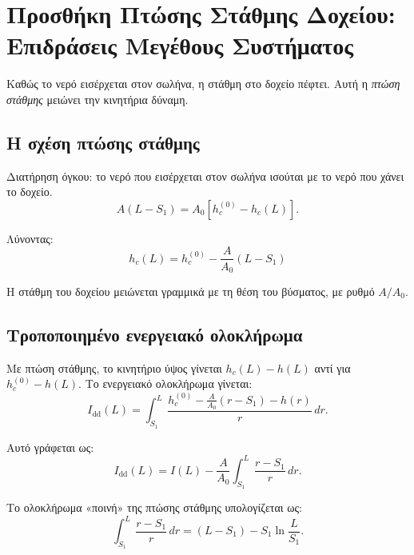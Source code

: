 \documentclass[11pt]{article}
\begin{document}
\section{Προσθήκη Πτώσης Στάθμης Δοχείου: Επιδράσεις Μεγέθους Συστήματος}
\label{sec:drawdown}

Καθώς το νερό εισέρχεται στον σωλήνα, η στάθμη στο δοχείο πέφτει. Αυτή η \emph{πτώση στάθμης} μειώνει την κινητήρια δύναμη.

\subsection{Η σχέση πτώσης στάθμης}

Διατήρηση όγκου: το νερό που εισέρχεται στον σωλήνα ισούται με το νερό που χάνει το δοχείο.
\[
  A(L - S_1) = A_0[h_c^{(0)} - h_c(L)].
\]

Λύνοντας:
\begin{equation}
  \boxed{h_c(L) = h_c^{(0)} - \frac{A}{A_0}(L - S_1)}
  \label{eq:drawdown}
\end{equation}

Η στάθμη του δοχείου μειώνεται γραμμικά με τη θέση του βύσματος, με ρυθμό $A/A_0$.

\subsection{Τροποποιημένο ενεργειακό ολοκλήρωμα}

Με πτώση στάθμης, το κινητήριο ύψος γίνεται $h_c(L) - h(L)$ αντί για $h_c^{(0)} - h(L)$. Το ενεργειακό ολοκλήρωμα γίνεται:
\begin{equation}
  I_{\text{dd}}(L) = \int_{S_1}^{L} \frac{h_c^{(0)} - \frac{A}{A_0}(r - S_1) - h(r)}{r} \, dr.
  \label{eq:I-dd-def}
\end{equation}

Αυτό γράφεται ως:
\begin{equation}
  I_{\text{dd}}(L) = I(L) - \frac{A}{A_0} \int_{S_1}^{L} \frac{r - S_1}{r} \, dr.
  \label{eq:I-dd-split}
\end{equation}

Το ολοκλήρωμα «ποινή» της πτώσης στάθμης υπολογίζεται ως:
\begin{equation}
  \int_{S_1}^{L} \frac{r - S_1}{r} \, dr = (L - S_1) - S_1 \ln\frac{L}{S_1}.
  \label{eq:drawdown-penalty}
\end{equation}
\end{document}
